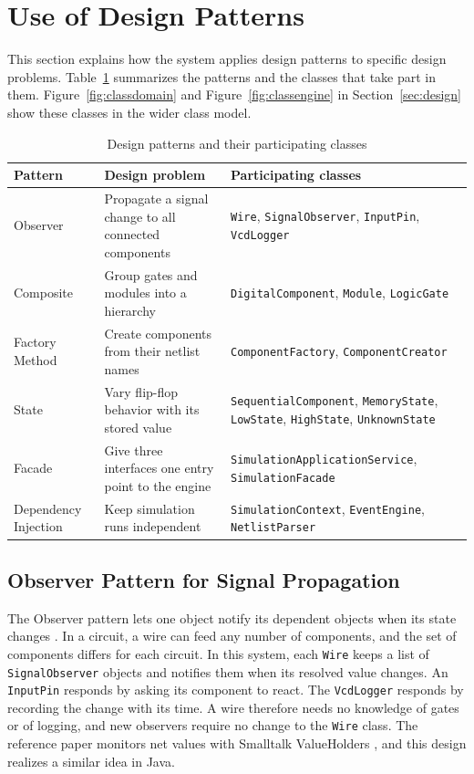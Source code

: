 \section{Use of Design Patterns}
\label{sec:patterns}

This section explains how the system applies design patterns to specific design problems.
Table~\ref{tab:patterns} summarizes the patterns and the classes that take part in them.
Figure~\ref{fig:classdomain} and Figure~\ref{fig:classengine} in Section~\ref{sec:design} show these classes in the wider class model.

\begin{table}[H]
\centering
\small
\caption{Design patterns and their participating classes}
\label{tab:patterns}
\begin{tabular}{>{\raggedright\arraybackslash}p{3.2cm}>{\raggedright\arraybackslash}p{5.2cm}>{\raggedright\arraybackslash}p{6.2cm}}
\toprule
\textbf{Pattern} & \textbf{Design problem} & \textbf{Participating classes} \\
\midrule
Observer & Propagate a signal change to all connected components & \texttt{Wire}, \texttt{SignalObserver}, \texttt{InputPin}, \texttt{VcdLogger} \\
Composite & Group gates and modules into a hierarchy & \texttt{DigitalComponent}, \texttt{Module}, \texttt{LogicGate} \\
Factory Method & Create components from their netlist names & \texttt{ComponentFactory}, \texttt{ComponentCreator} \\
State & Vary flip-flop behavior with its stored value & \texttt{SequentialComponent}, \texttt{MemoryState}, \texttt{LowState}, \texttt{HighState}, \texttt{UnknownState} \\
Facade & Give three interfaces one entry point to the engine & \texttt{SimulationApplicationService}, \texttt{SimulationFacade} \\
Dependency Injection & Keep simulation runs independent & \texttt{SimulationContext}, \texttt{EventEngine}, \texttt{NetlistParser} \\
\bottomrule
\end{tabular}
\end{table}

\subsection{Observer Pattern for Signal Propagation}

The Observer pattern lets one object notify its dependent objects when its state changes .
In a circuit, a wire can feed any number of components, and the set of components differs for each circuit.
In this system, each \texttt{Wire} keeps a list of \texttt{SignalObserver} objects and notifies them when its resolved value changes.
An \texttt{InputPin} responds by asking its component to react.
The \texttt{VcdLogger} responds by recording the change with its time.
A wire therefore needs no knowledge of gates or of logging, and new observers require no change to the \texttt{Wire} class.
The reference paper monitors net values with Smalltalk ValueHolders , and this design realizes a similar idea in Java.

